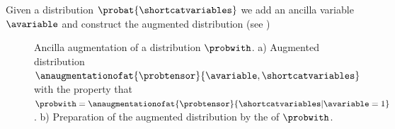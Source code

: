 Given a distribution $\probat{\shortcatvariables}$ we add an ancilla variable $\avariable$ and construct the augmented distribution (see )

\begin{figure}
    \begin{center}
        
    \end{center}
    \caption{
        Ancilla augmentation of a distribution $\probwith$.
        a) Augmented distribution $\anaugmentationofat{\probtensor}{\avariable,\shortcatvariables}$ with the property that $\probwith = \anaugmentationofat{\probtensor}{\shortcatvariables|\avariable=1}$.
        b) Preparation of the augmented distribution by the \activationCircuit{} of $\probwith$.
    }\label{fig:ancillaAugmentation}
\end{figure}


